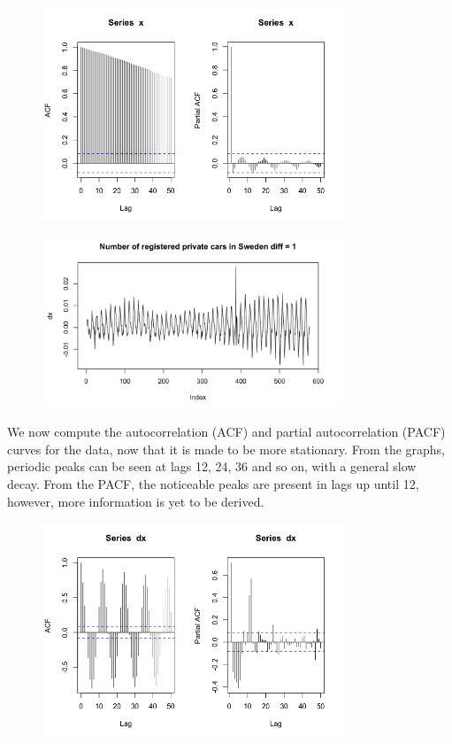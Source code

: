 \documentclass[a4paper,11pt]{article}
\begin{document}
    \begin{figure}[H]
        \centering
        \includegraphics[width=0.8\textwidth]{ha-1_files/figure-markdown_strict/unnamed-chunk-1-3.png}
        \label{fig:f3}
    \end{figure}

    \begin{figure}[H]
        \centering
        \includegraphics[width=0.8\textwidth]{ha-1_files/diff.png}
        \label{fig:f3}
    \end{figure}

    We now compute the autocorrelation (ACF) and partial autocorrelation (PACF) curves for the data, now that it is made to be more stationary. From the graphs, periodic peaks can be seen at lags 12, 24, 36 and so on, with a general slow decay. From the PACF, the noticeable peaks are present in lags up until 12, however, more information is yet to be derived. 

    \begin{figure}[H]
        \centering
        \includegraphics[width=0.8\textwidth]{ha-1_files/figure-markdown_strict/unnamed-chunk-2-2.png}
        \label{fig:f4}
    \end{figure}
\end{document}
